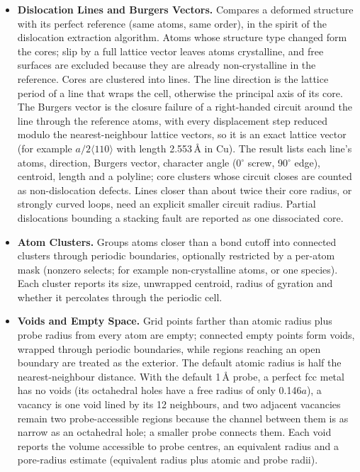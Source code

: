 \begin{itemize}
\item \textbf{Dislocation Lines and Burgers Vectors.} Compares a deformed structure with its perfect reference (same atoms, same order), in the spirit of the dislocation extraction algorithm. Atoms whose structure type changed form the cores; slip by a full lattice vector leaves atoms crystalline, and free surfaces are excluded because they are already non-crystalline in the reference. Cores are clustered into lines. The line direction is the lattice period of a line that wraps the cell, otherwise the principal axis of its core. The Burgers vector is the closure failure of a right-handed circuit around the line through the reference atoms, with every displacement step reduced modulo the nearest-neighbour lattice vectors, so it is an exact lattice vector (for example $a/2\langle110\rangle$ with length 2.553\,\AA{} in Cu). The result lists each line's atoms, direction, Burgers vector, character angle (0$^\circ$ screw, 90$^\circ$ edge), centroid, length and a polyline; core clusters whose circuit closes are counted as non-dislocation defects. Lines closer than about twice their core radius, or strongly curved loops, need an explicit smaller circuit radius. Partial dislocations bounding a stacking fault are reported as one dissociated core.
\item \textbf{Atom Clusters.} Groups atoms closer than a bond cutoff into connected clusters through periodic boundaries, optionally restricted by a per-atom mask (nonzero selects; for example non-crystalline atoms, or one species). Each cluster reports its size, unwrapped centroid, radius of gyration and whether it percolates through the periodic cell.
\item \textbf{Voids and Empty Space.} Grid points farther than atomic radius plus probe radius from every atom are empty; connected empty points form voids, wrapped through periodic boundaries, while regions reaching an open boundary are treated as the exterior. The default atomic radius is half the nearest-neighbour distance. With the default 1\,\AA{} probe, a perfect fcc metal has no voids (its octahedral holes have a free radius of only 0.146$a$), a vacancy is one void lined by its 12 neighbours, and two adjacent vacancies remain two probe-accessible regions because the channel between them is as narrow as an octahedral hole; a smaller probe connects them. Each void reports the volume accessible to probe centres, an equivalent radius and a pore-radius estimate (equivalent radius plus atomic and probe radii).

\end{itemize}
